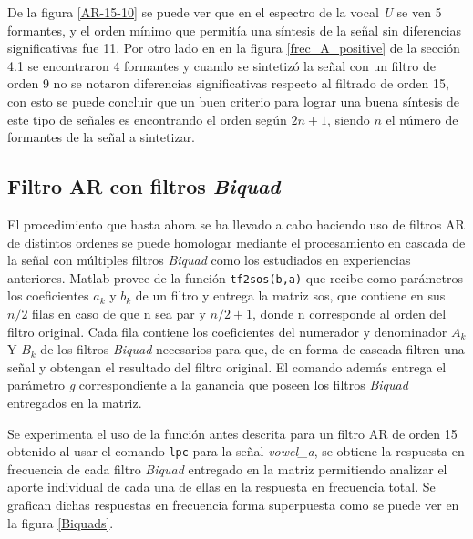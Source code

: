 De la figura \ref{AR-15-10} se puede ver que en el espectro de la vocal \textit{U} se ven 5 formantes, y el orden mínimo que permitía una síntesis de la señal sin diferencias significativas fue 11. Por otro lado en en la figura \ref{frec_A_positive} de la sección 4.1 se encontraron 4 formantes y cuando se sintetizó la señal con un filtro de orden 9 no se notaron diferencias significativas respecto al filtrado de orden 15, con esto se puede concluir que un buen criterio para lograr una buena síntesis de este tipo de señales es encontrando el orden según $2n + 1$, siendo $n$ el número de formantes de la señal a sintetizar.
\subsection{Filtro AR con filtros \textit{ \textit{Biquad}}}

El procedimiento que hasta ahora se ha  llevado a cabo haciendo uso de filtros AR de distintos ordenes se puede homologar mediante el procesamiento en cascada de la señal con múltiples filtros \textit{ \textit{Biquad}} como los estudiados en experiencias anteriores. Matlab provee de la función  \texttt{tf2sos(b,a)} que recibe como parámetros los coeficientes $a_k$ y $b_k$ de un filtro y entrega la matriz sos, que contiene en sus $n/2$ filas en caso de que n sea par y $n/2 + 1$, donde n corresponde al orden del filtro original. Cada fila contiene los coeficientes del numerador y denominador $A_k$ Y $B_k$ de los filtros \textit{\textit{ \textit{Biquad}}} necesarios para que, de en forma de cascada filtren una señal y obtengan el resultado del filtro original. El comando además entrega el  parámetro \textit{g} correspondiente a la ganancia que poseen los filtros \textit{\textit{ \textit{Biquad}}}  entregados en la matriz.


Se experimenta el uso de la función  antes descrita para un filtro AR de orden 15 obtenido al usar el comando \texttt{lpc} para la señal \textit{vowel\_a}, se obtiene la respuesta en frecuencia de cada filtro  \textit{Biquad} entregado en la matriz permitiendo analizar el aporte individual de cada una de ellas en la respuesta en frecuencia total. Se grafican dichas respuestas en frecuencia  forma superpuesta como se puede ver en la figura \ref{Biquads}.


